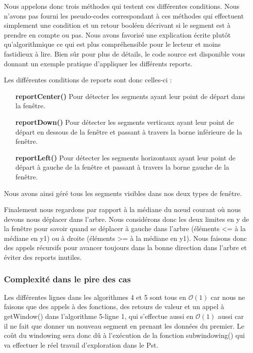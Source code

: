 \documentclass[10pt,a4paper]{article}
\begin{document}
Nous appelons donc trois méthodes qui testent ces différentes conditions. Nous n'avons pas fourni les pseudo-codes correspondant à ces méthodes qui effectuent simplement une condition et un retour booléen décrivant si le segment est à prendre en compte ou pas. Nous avons favorisé une explication écrite plutôt qu'algorithmique ce qui est plus compréhensible pour le lecteur et moins fastidieux à lire. Bien sûr pour plus de détails, le code source est disponible vous donnant un exemple pratique d'appliquer les différents reports.

Les différentes conditions de reports sont donc celles-ci :\begin{itemize}
\item[\textbf{reportCenter()}] Pour détecter les segments ayant leur point de départ dans la fenêtre.

\item[\textbf{reportDown()}] Pour détecter les segments verticaux ayant leur point de départ en dessous de la fenêtre et passant à travers la borne inférieure de la fenêtre.

\item[\textbf{reportLeft()}] Pour détecter les segments horizontaux ayant leur point de départ à gauche de la fenêtre et passant à travers la borne gauche de la fenêtre.

\end{itemize}
Nous avons ainsi géré tous les segments visibles dans nos deux types de fenêtre.

Finalement nous regardons par rapport à la médiane du nœud courant où nous devons nous déplacer dans l'arbre. Nous considérons donc les deux limites en y de la fenêtre pour savoir quand se déplacer à gauche dans l'arbre (éléments <= à la médiane en y1) ou à droite (éléments >= à la médiane en y1). Nous faisons donc des appels récursifs pour avancer toujours dans la bonne direction dans l'arbre et éviter des reports inutiles.

\subsubsection{Complexité dans le pire des cas}

Les différentes lignes dans les algorithmes 4 et 5 sont tous en $\mathcal{O}(1)$ car nous ne faisons que des appels à des fonctions, des retours de valeur et un appel à getWindow() dans l'algorithme 5-ligne 1, qui s'effectue aussi en $\mathcal{O}(1)$ aussi car il ne fait que donner un nouveau segment en prenant les données du premier. Le coût du windowing sera donc dû à l’exécution de la fonction subwindowing() qui va effectuer le réel travail d'exploration dans le Pst.
\end{document}
